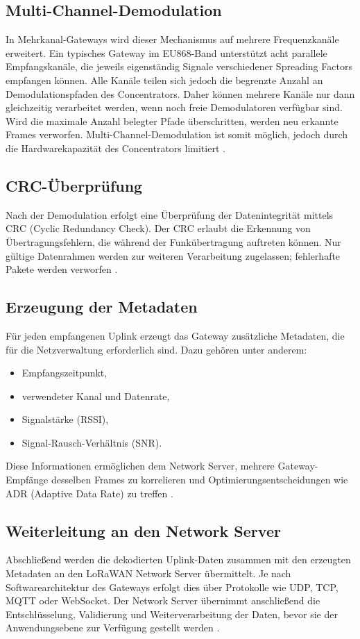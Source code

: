 \subsection{Multi-Channel-Demodulation}
	In Mehrkanal-Gateways wird dieser Mechanismus auf mehrere Frequenzkanäle erweitert. Ein typisches Gateway im EU868-Band unterstützt acht parallele Empfangskanäle, die jeweils eigenständig Signale verschiedener Spreading Factors empfangen können. Alle Kanäle teilen sich jedoch die begrenzte Anzahl an Demodulationspfaden des Concentrators. Daher können mehrere Kanäle nur dann gleichzeitig verarbeitet werden, wenn noch freie Demodulatoren verfügbar sind. Wird die maximale Anzahl belegter Pfade überschritten, werden neu erkannte Frames verworfen. Multi-Channel-Demodulation ist somit möglich, jedoch durch die Hardwarekapazität des Concentrators limitiert \cite{Sorensen:2019} \cite{Semtech:2024b} \cite{Semtech:2024}.

\subsection{CRC-Überprüfung}
	Nach der Demodulation erfolgt eine Überprüfung der Datenintegrität mittels CRC (Cyclic Redundancy Check). Der CRC erlaubt die Erkennung von Übertragungsfehlern, die während der Funkübertragung auftreten können. Nur gültige Datenrahmen werden zur weiteren Verarbeitung zugelassen; fehlerhafte Pakete werden verworfen \cite{Semtech:2024}.

\subsection{Erzeugung der Metadaten}
	Für jeden empfangenen Uplink erzeugt das Gateway zusätzliche Metadaten, die für die Netzverwaltung erforderlich sind. Dazu gehören unter anderem:
	\begin{itemize}
		\item Empfangszeitpunkt,
		\item verwendeter Kanal und Datenrate,
		\item Signalstärke (RSSI),
		\item Signal-Rausch-Verhältnis (SNR).
	\end{itemize}
	Diese Informationen ermöglichen dem Network Server, mehrere Gateway-Empfänge desselben Frames zu korrelieren und Optimierungsentscheidungen wie ADR (Adaptive Data Rate) zu treffen \cite{LoRaAlliance:2020c} \cite{Semtech:2024}.

\subsection{Weiterleitung an den Network Server \label{gateway:backhaul}}
	Abschlie{\ss}end werden die dekodierten Uplink-Daten zusammen mit den erzeugten Metadaten an den LoRaWAN Network Server übermittelt. Je nach Softwarearchitektur des Gateways erfolgt dies über Protokolle wie UDP, TCP, MQTT oder WebSocket. Der Network Server übernimmt anschlie{\ss}end die Entschlüsselung, Validierung und Weiterverarbeitung der Daten, bevor sie der Anwendungsebene zur Verfügung gestellt werden \cite{Semtech:2024}.


